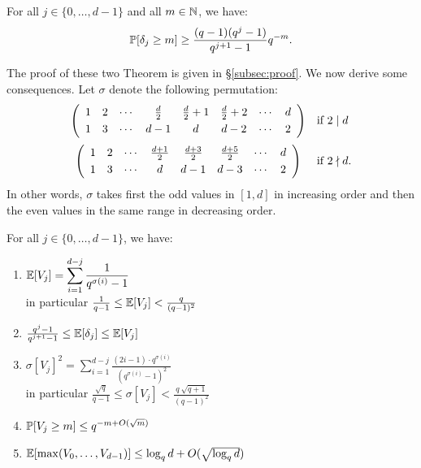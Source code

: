 \documentclass{sig-alternate}
\begin{document}
\begin{theo}
\label{th:deltaj}
For all $j \in \{0, \ldots, d-1\}$ and all $m \in \N$, we have:
$$\P[\delta_j \geq m] \geq \frac{(q-1)(q^j-1)}{q^{j+1}-1} q^{-m}.$$
\end{theo}

The proof of these two Theorem is given in \S \ref{subsec:proof}. 
We now derive some consequences. Let $\sigma$ denote the following
permutation:
$$\begin{array}{cl}
\left(
\begin{array}{cccccccc}
1 & 2 & \cdots & \frac d 2 & \frac d 2 + 1 & \frac d 2 + 2 & \cdots & d \smallskip \\
1 & 3 & \cdots & d-1 & d & d-2 & \cdots & 2 
\end{array} \right) & \text{if } 2 \mid d \medskip \\
\left(
\begin{array}{cccccccc}
1 & 2 & \cdots & \frac{d+1} 2 & \frac{d+3} 2 & \frac{d+5} 2 & \cdots & d \smallskip \\
1 & 3 & \cdots & d & d-1 & d-3 & \cdots & 2 
\end{array} \right) & \text{if } 2 \nmid d.
\end{array}$$
In other words, $\sigma$ takes first the odd values in $[1,d]$ in 
increasing order and then the even values in the same range in 
decreasing order.

\begin{cor}
\label{cor:Vj}
For all $j \in \{0, \ldots, d-1\}$, we have:

\begin{enumerate}[\hspace{0.3cm}(1)]
\setlength\itemsep{0.1em}
\item $\E[V_j] = 
\displaystyle \sum_{i=1}^{d-j} \frac 1 {q^{\sigma(i)} - 1}$ \\
in particular $\frac 1 {q-1} \leq \E[V_j] < \frac q {(q-1)^2}$
\item $\frac {q^j - 1}{q^{j+1} - 1} \leq \E[\delta_j] \leq \E[V_j]$
\item $\sigma[V_j]^2 = 
\displaystyle \sum_{i=1}^{d-j} \frac {(2i-1) \cdot q^{\sigma(i)}}
{(q^{\sigma(i)} - 1)^2}$ \\
in particular $\frac{\sqrt q}{q-1} \leq \sigma[V_j] < 
\frac {q \:\sqrt{q+1}} {(q-1)^2}$
\item $\P[V_j \geq m] \leq q^{-m + O(\sqrt m)}$
\item $\E[\max(V_0, \ldots, V_{d-1})] \leq \log_q d + O(\sqrt{\log_q d})$
\end{enumerate}
\end{cor}
\end{document}
